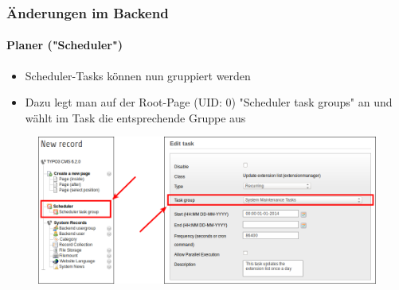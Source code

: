 \begin{frame}[fragile]
	\frametitle{Änderungen im Backend}
	\framesubtitle{Planer ("Scheduler")}

	\begin{itemize}
		\item Scheduler-Tasks können nun gruppiert werden
		\item Dazu legt man auf der Root-Page (UID: 0) "Scheduler task groups" an und wählt im Task die entsprechende Gruppe aus
	\end{itemize}

	\begin{figure}
		\includegraphics[width=0.85\linewidth]{Images/BackendChanges/SchedulerTaskGroup.png}
	\end{figure}

\end{frame}


